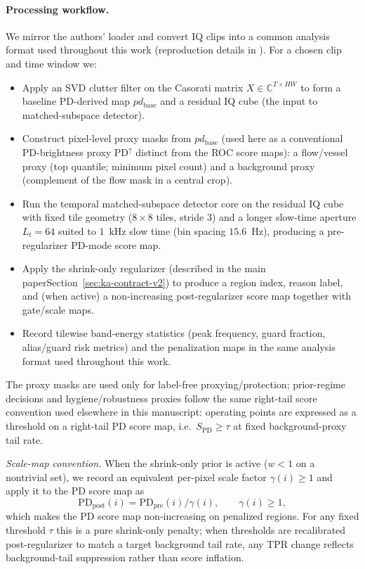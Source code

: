 \paragraph{Processing workflow.}
We mirror the authors' loader and convert IQ clips into a common analysis format used throughout this work (reproduction details in ). For a chosen clip and time window we:
\begin{itemize}[nosep]
  \item Apply an SVD clutter filter on the Casorati matrix $X\in\mathbb{C}^{T\times HW}$ to form a baseline PD-derived map $pd_{\mathrm{base}}$ and a residual IQ cube (the input to matched-subspace detector).
  \item Construct pixel-level proxy masks from $pd_{\mathrm{base}}$ (used here as a conventional PD-brightness proxy $\mathrm{PD}^{\uparrow}$ distinct from the ROC score maps): a flow/vessel proxy (top quantile; minimum pixel count) and a background proxy (complement of the flow mask in a central crop).
  \item Run the temporal matched-subspace detector core on the residual IQ cube with fixed tile geometry ($8\times 8$ tiles, stride 3) and a longer slow-time aperture $L_t=64$ suited to $1$~kHz slow time (bin spacing $15.6$~Hz), producing a pre-regularizer PD-mode score map.
  \item Apply the shrink-only regularizer (\ifSUPPLEMENTONLY described in the main paper\else Section~\ref{sec:ka-contract-v2}\fi) to produce a region index, reason label, and (when active) a non-increasing post-regularizer score map together with gate/scale maps.
  \item Record tilewise band-energy statistics (peak frequency, guard fraction, alias/guard risk metrics) and the penalization maps in the same analysis format used throughout this work.
\end{itemize}
The proxy masks are used only for label-free proxying/protection; prior-regime decisions and hygiene/robustness proxies follow the same right-tail score convention used elsewhere in this manuscript: operating points are expressed as a threshold on a right-tail PD score map, i.e.\ $S_{\mathrm{PD}}\ge\tau$ at fixed background-proxy tail rate.

\emph{Scale-map convention.} When the shrink-only prior is active ($w<1$ on a nontrivial set), we record an equivalent per-pixel scale factor $\gamma(i)\ge 1$ and apply it to the PD score map as
\[
\mathrm{PD}_{\mathrm{post}}(i)=\mathrm{PD}_{\mathrm{pre}}(i)/\gamma(i),\qquad \gamma(i)\ge 1,
\]
which makes the PD score map non-increasing on penalized regions. For any fixed threshold $\tau$ this is a pure shrink-only penalty; when thresholds are recalibrated post-regularizer to match a target background tail rate, any TPR change reflects background-tail suppression rather than score inflation.


